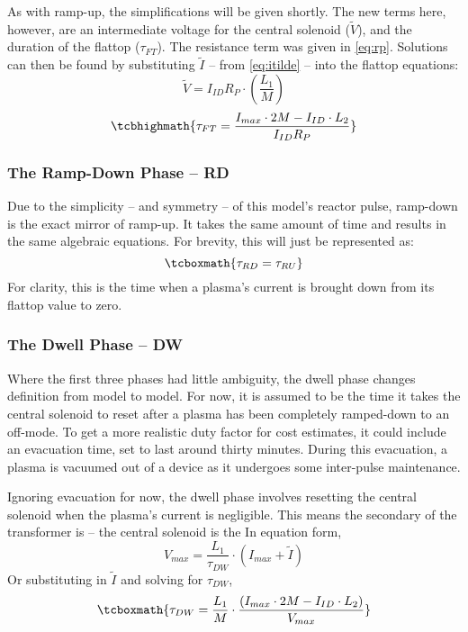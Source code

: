 As with ramp-up, the simplifications will be given shortly. The new terms here, however, are an intermediate voltage for the central solenoid ($\tilde V$), and the duration of the flattop ($\tau_{FT}$). The resistance term was given in \cref{eq:rp}. Solutions can then be found by substituting $\tilde I$ -- from \cref{eq:itilde} -- into the flattop equations:
\begin{equation}
	\tilde V = I_{ID} R_P \cdot \left( \frac{L_1}{M} \right)
\end{equation}
\begin{equation}
	\label{eq:tauft}
	\tcbhighmath{
	\tau_{FT} = \frac{ I_{max} \cdot 2 M - I_{ID} \cdot  L_2 }{I_{ID} R_P}
	}
\end{equation}

\subsubsection{The Ramp-Down Phase -- RD}

Due to the simplicity -- and symmetry -- of this model's reactor pulse, ramp-down is the exact mirror of ramp-up. It takes the same amount of time and results in the same algebraic equations. For brevity, this will just be represented as:
\begin{equation}
	\label{eq:taurd}
	\tcboxmath{
	\tau_{RD} = \tau_{RU}
	}
\end{equation}
For clarity, this is the time when a plasma's current is brought down from its flattop value to zero.

\subsubsection{The Dwell Phase -- DW}

Where the first three phases had little ambiguity, the dwell phase changes definition from model to model. For now, it is assumed to be the time it takes the central solenoid to reset after a plasma has been completely ramped-down to an off-mode. To get a more realistic duty factor for cost estimates, it could include an evacuation time, set to last around thirty minutes. During this evacuation, a plasma is vacuumed out of a device as it undergoes some inter-pulse maintenance.

Ignoring evacuation for now, the dwell phase involves resetting the central solenoid when the plasma's current is negligible. This means the secondary of the transformer is  --  the central solenoid is the  In equation form,
\begin{equation}
	V_{max} = \frac{L_1}{\tau_{DW}} \cdot \left( I_{max} + \tilde I \right)
\end{equation}
Or substituting in $\tilde I$ and solving for $\tau_{DW}$,
\begin{equation}
	\label{eq:taudw}
	\tcboxmath{
	\tau_{DW} = \frac{L_1}{M} \cdot \frac{ \left( I_{max} \cdot 2 M - I_{ID} \cdot  L_2 \right) }{V_{max}}
	}
\end{equation}

